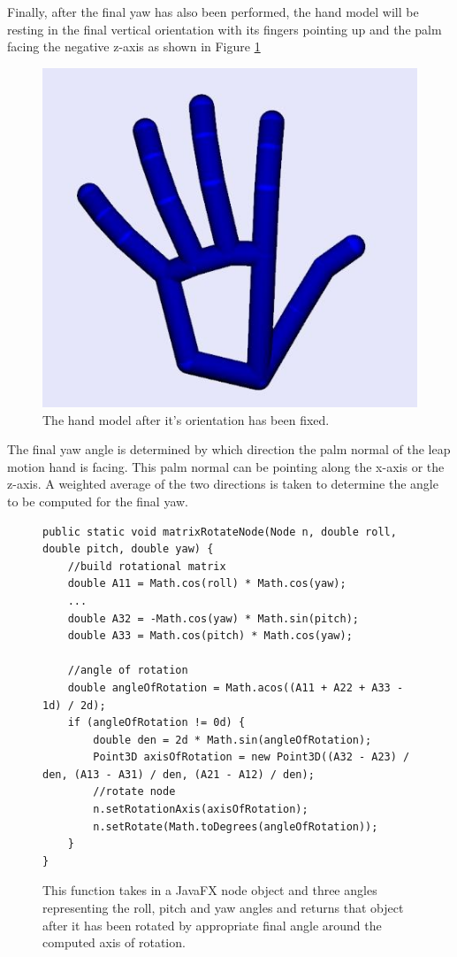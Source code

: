 Finally, after the final yaw has also been performed, the hand model will be resting in the final vertical orientation with its fingers pointing up and the palm facing the negative z-axis as shown in Figure \ref{fig:finalPos}
\begin{figure}[H]
\centering
\includegraphics[scale=0.65]{Figures/4_handFinalFix.JPG}
\caption[After Final Yaw]{The hand model after it's orientation has been fixed.}
\label{fig:finalPos}
\end{figure}
The final yaw angle is determined by which direction the palm normal of the leap motion hand is facing. This palm normal can be pointing along the x-axis or the z-axis. A weighted average of the two directions is taken to determine the angle to be computed for the final yaw. 

\begin{figure}[H]
\centering
\begin{lstlisting}
public static void matrixRotateNode(Node n, double roll, double pitch, double yaw) {
	//build rotational matrix
	double A11 = Math.cos(roll) * Math.cos(yaw);
	...
	double A32 = -Math.cos(yaw) * Math.sin(pitch);
	double A33 = Math.cos(pitch) * Math.cos(yaw);

	//angle of rotation
	double angleOfRotation = Math.acos((A11 + A22 + A33 - 1d) / 2d);
	if (angleOfRotation != 0d) {
		double den = 2d * Math.sin(angleOfRotation);
		Point3D axisOfRotation = new Point3D((A32 - A23) / den, (A13 - A31) / den, (A21 - A12) / den);
		//rotate node
		n.setRotationAxis(axisOfRotation);
		n.setRotate(Math.toDegrees(angleOfRotation));
	}
}
\end{lstlisting}
\caption[matrixRotateNode() Function]{This function takes in a JavaFX node object and three angles representing the roll, pitch and yaw angles and returns that object after it has been rotated by appropriate final angle around the computed axis of rotation.}
\label{fig:matrixRotateNode}
\end{figure}

